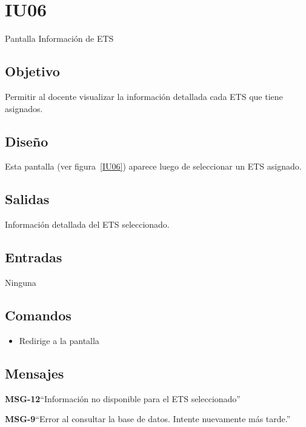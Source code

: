 \section{IU06}{Pantalla Información de ETS}

\subsection{Objetivo}
	Permitir al docente visualizar la información detallada cada ETS que tiene asignados.
	
\subsection{Diseño}
	Esta pantalla  (ver figura~\ref{IU06}) aparece luego de seleccionar un ETS asignado. 


\subsection{Salidas}

	Información detallada del ETS seleccionado. 

\subsection{Entradas}
Ninguna

\subsection{Comandos}
\begin{itemize}
	\item {} Redirige a la pantalla 
\end{itemize}

\subsection{Mensajes}

\begin{Citemize}
	\item {\bf MSG-12}{``Información no disponible para el ETS seleccionado''}
	\item {\bf MSG-9}{``Error al consultar la base de datos. Intente nuevamente más tarde.''}
\end{Citemize}

